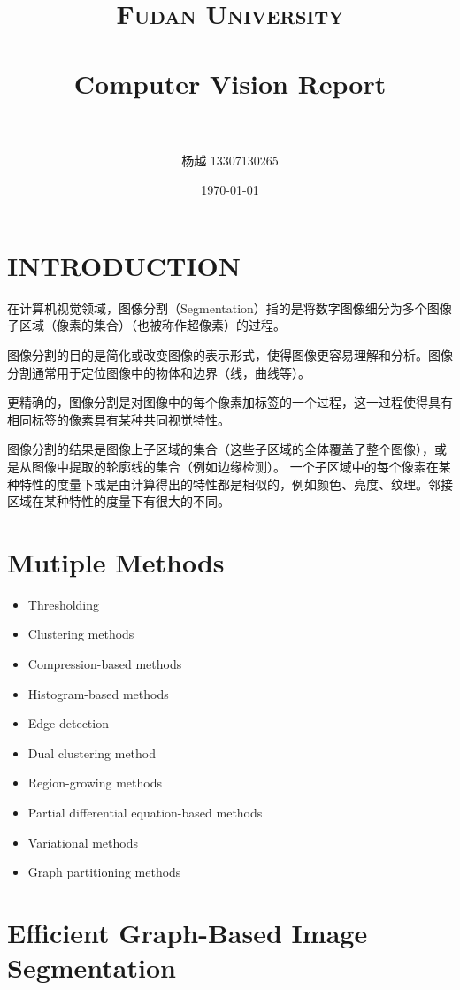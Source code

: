 \documentclass[paper=a4, fontsize=11pt]{scrartcl} %
\title{	
\normalfont \normalsize 
\textsc{Fudan University} \\ [25pt] %
\horrule{0.5pt} \\[0.4cm] %
\huge Computer Vision Report \\ %
\horrule{2pt} \\[0.5cm] %
}
\author{杨越 13307130265} %
\date{\normalsize\today} %
\numberwithin{equation}{section} %
\numberwithin{figure}{section} %
\numberwithin{table}{section} %
\begin{document}
\maketitle %


\section{INTRODUCTION}

在计算机视觉领域，图像分割（Segmentation）指的是将数字图像细分为多个图像子区域（像素的集合）（也被称作超像素）的过程。

图像分割的目的是简化或改变图像的表示形式，使得图像更容易理解和分析。图像分割通常用于定位图像中的物体和边界（线，曲线等）。

更精确的，图像分割是对图像中的每个像素加标签的一个过程，这一过程使得具有相同标签的像素具有某种共同视觉特性。

图像分割的结果是图像上子区域的集合（这些子区域的全体覆盖了整个图像），或是从图像中提取的轮廓线的集合（例如边缘检测）。
一个子区域中的每个像素在某种特性的度量下或是由计算得出的特性都是相似的，例如颜色、亮度、纹理。邻接区域在某种特性的度量下有很大的不同。

\section{Mutiple Methods}

\begin{itemize}
\item Thresholding
\item Clustering methods
\item Compression-based methods
\item Histogram-based methods
\item Edge detection
\item Dual clustering method
\item Region-growing methods
\item Partial differential equation-based methods
\item Variational methods
\item Graph partitioning methods

\end{itemize}

\section{Efficient Graph-Based Image Segmentation}
\end{document}
